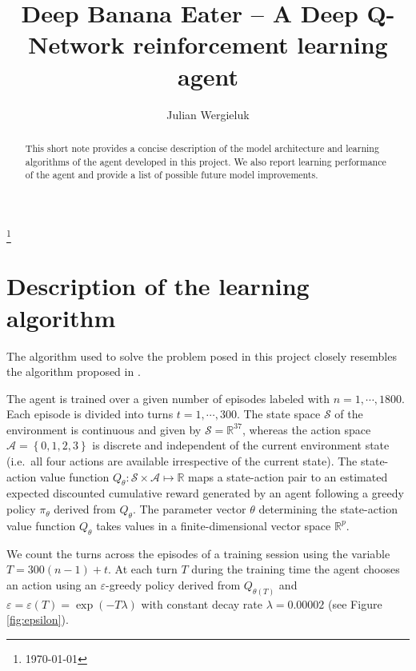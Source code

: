 \documentclass[a4paper,11pt]{amsart}
\title{Deep Banana Eater -- A Deep Q-Network reinforcement learning agent}
\author{Julian Wergieluk}\address{}\email{julian.wergieluk@risklab.com}
\begin{document}
\maketitle

\begin{abstract}
This short note provides a concise description of the model architecture and
learning algorithms of the agent developed in this project. We also report learning
performance of the agent and provide a list of possible future model improvements.
\end{abstract}
\renewcommand*{\thefootnote}{}\footnote{\today{}}

\section{Description of the learning algorithm}


The algorithm used to solve the problem posed in this project closely resembles
the algorithm proposed in \cite{mnih2015humanlevel}.

The agent is trained over a given number of episodes labeled with $n = 1,\cdots, 1800$.
Each episode is divided into turns $t = 1,\cdots, 300$.
The state space $\mathcal S$ of the environment is continuous and given by
$\mathcal S = \mathbb R^{37}$, whereas the action space $\mathcal A = \left\{
0,1,2,3 \right\}$ is discrete and independent of the current environment state
(i.e.\ all four actions are available irrespective of the current state). The state-action value
function $Q_{\theta}: \mathcal S \times \mathcal A \mapsto \mathbb R$ maps a
state-action pair to an estimated expected discounted cumulative reward
generated by an agent following a greedy policy $\pi_{\theta}$ derived from $Q_{\theta}$.
The parameter vector $\theta$ determining the state-action value function
$Q_{\theta}$ takes values in a finite-dimensional vector space $\mathbb R^{p}$. 

We count the turns across the episodes of a training session using the variable $T =
300(n-1) + t$. At each turn $T$ during the training time the agent chooses an
action using an $\varepsilon$-greedy policy derived from $Q_{\theta(T)}$ and
$\varepsilon = \varepsilon(T) = \operatorname{exp}\left( -T \lambda \right)$ with
constant decay rate $\lambda = 0.00002$ (see Figure \ref{fig:epsilon}).
\end{document}
